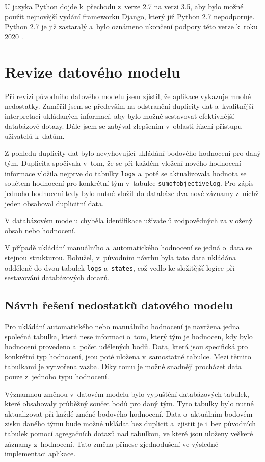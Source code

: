 \documentclass[
  digital,
  twoside,
  table, 
  nolof, 
  nolot
]{fithesis3}
\begin{document}
U jazyka Python dojde k~přechodu z~verze 2.7 na verzi 3.5, aby bylo možné použít nejnovější vydání frameworku Django, který již Python 2.7 nepodporuje. Python 2.7 je již zastaralý a~bylo oznámeno ukončení podpory této verze k~roku 2020 \cite{python27}.


\section{Revize datového modelu}

Při revizi původního datového modelu jsem zjistil, že aplikace vykazuje mnohé nedostatky. Zaměřil jsem se především na odstranění duplicity dat a~kvalitnější interpretaci ukládaných informací, aby bylo možné sestavovat efektivnější databázové dotazy. Dále jsem se zabýval zlepšením v~oblasti řízení přístupu uživatelů k~datům.

Z pohledu duplicity dat bylo nevyhovující ukládání bodového hodnocení pro daný tým. Duplicita spočívala v~tom, že se při každém vložení nového hodnocení informace vložila nejprve do tabulky \texttt{logs} a~poté se aktualizovala hodnota se součtem hodnocení pro konkrétní tým v~tabulce \texttt{sumofobjectivelog}. Pro zápis jednoho hodnocení tedy bylo nutné vložit do databáze dva nové záznamy z~nichž jeden obsahoval duplicitní data.

V databázovém modelu chyběla identifikace uživatelů zodpovědných za vložený obsah nebo hodnocení. 

V případě ukládání manuálního a~automatického hodnocení se jedná o~data se stejnou strukturou. Bohužel, v~původním návrhu byla tato data ukládána odděleně do dvou tabulek \texttt{logs} a~\texttt{states}, což vedlo ke složitější logice při sestavování databázových dotazů.

\subsection{Návrh řešení nedostatků datového modelu}
Pro ukládání automatického nebo manuálního hodnocení je navržena jedna společná tabulka, která nese informaci o~tom, který tým je hodnocen, kdy bylo hodnocení provedeno a~počet udělených bodů. Data, která jsou specifická pro konkrétní typ hodnocení, jsou poté uložena v~samostatné tabulce. Mezi těmito tabulkami je vytvořena vazba. Díky tomu je možné snadněji procházet data pouze z~jednoho typu hodnocení.

Významnou změnou v~datovém modelu bylo vypuštění databázových tabulek, které obsahovaly průběžný součet bodů pro daný tým. Tyto tabulky bylo nutné aktualizovat při každé změně bodového hodnocení. Data o~aktuálním bodovém zisku daného týmu bude možné ukládat bez duplicit a~zjistit je i~bez původních tabulek pomocí agregačních dotazů nad tabulkou, ve které jsou uloženy veškeré záznamy z~hodnocení. Tato změna přinese zjednodušení ve výsledné implementaci aplikace.
\end{document}

